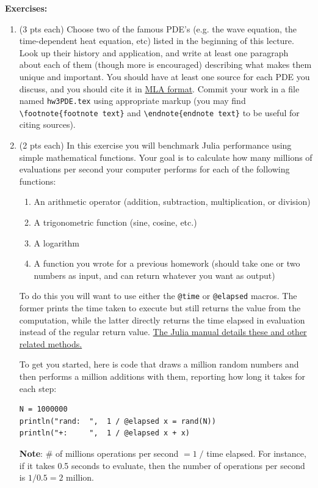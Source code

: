 \documentclass[11pt,a4paper,oneside]{report}
\begin{document}
{\bf Exercises: }
\begin{enumerate}
\item (3 pts each) Choose two of the famous PDE's (e.g. the wave equation, the time-dependent heat equation, etc) listed in the beginning of this lecture. Look up their history and application, and write at least one paragraph about each of them (though more is encouraged) describing what makes them unique and important. You should have at least one source for each PDE you discuss, and you should cite it in \href{http://www.library.cornell.edu/resrch/citmanage/mla}{MLA format}. Commit your work in a file named \verb+hw3PDE.tex+ using appropriate markup (you may find \verb+\footnote{footnote text}+ and \verb+\endnote{endnote text}+ to be useful for citing sources).

\item (2 pts each) In this exercise you will benchmark Julia performance using simple mathematical functions. Your goal is to calculate how many millions of evaluations per second your computer performs for each of the following functions:
\begin{enumerate}
\item An arithmetic operator (addition, subtraction, multiplication, or division)
\item A trigonometric function (sine, cosine, etc.)
\item A logarithm
\item A function you wrote for a previous homework (should take one or two numbers as input, and can return whatever you want as output)
\end{enumerate}

To do this you will want to use either the \verb+@time+ or \verb+@elapsed+ macros. The former prints the time taken to execute but still returns the value from the computation, while the latter directly returns the time elapsed in evaluation instead of the regular return value. \href{http://docs.julialang.org/en/latest/stdlib/base/?highlight=tic#Base.@time}{The Julia manual details these and other related methods.}

To get you started, here is code that draws a million random numbers and then performs a million additions with them, reporting how long it takes for each step:
\begin{verbatim}
N = 1000000
println("rand:  ",  1 / @elapsed x = rand(N))
println("+:     ",  1 / @elapsed x + x)
\end{verbatim}

{\bf Note}: \# of millions operations per second $= 1 \; / $ time elapsed. For instance, if it takes 0.5 seconds to evaluate, then the number of operations per second is $1 / 0.5 = 2$ million.


\end{enumerate}
\end{document}
